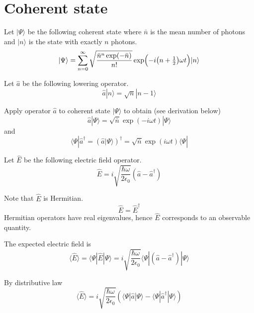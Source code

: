 

\section*{Coherent state}

Let $|\Psi\rangle$ be the following coherent state where $\bar n$ is the mean number of photons
and $|n\rangle$ is the state with exactly $n$ photons.
\begin{equation*}
|\Psi\rangle=\sum_{n=0}^\infty
\sqrt{\frac{\bar n^n\exp(-\bar n)}{n!}}
\exp\Bigl(-i\bigl(n+\tfrac{1}{2}\bigr)\omega t\Bigr)
|n\rangle
\end{equation*}

Let $\hat a$ be the following lowering operator.
\begin{equation*}
\hat a|n\rangle=\sqrt n|n-1\rangle
\end{equation*}

Apply operator $\hat a$ to coherent state $|\Psi\rangle$ to obtain (see derivation below)
\begin{equation*}
\hat a|\Psi\rangle=\sqrt{\bar n}\exp(-i\omega t)|\Psi\rangle
\end{equation*}
and
\begin{equation*}
\langle\Psi|\hat a^\dag=\left(\hat a|\Psi\rangle\right)^\dag=\sqrt{\bar n}\exp(i\omega t)\langle\Psi|
\end{equation*}

Let $\hat E$ be the following electric field operator.
\begin{equation*}
\hat E=i\sqrt{\frac{\hbar\omega}{2\epsilon_0}}
(\hat a-\hat a^\dag)
\end{equation*}

Note that $\hat E$ is Hermitian.
\begin{equation*}
\hat E=\hat E^\dag
\end{equation*}
Hermitian operators have real eigenvalues,
hence $\hat E$ corresponds to an observable quantity.

\bigskip
The expected electric field is
\begin{equation*}
\langle\hat E\rangle
=\langle\Psi|\hat E|\Psi\rangle
=i\sqrt{\frac{\hbar\omega}{2\epsilon_0}}
\langle\Psi|(\hat a-\hat a^\dag)|\Psi\rangle
\end{equation*}

By distributive law
\begin{equation*}
\langle\hat E\rangle
=i\sqrt{\frac{\hbar\omega}{2\epsilon_0}}
\left(\langle\Psi|\hat a|\Psi\rangle-\langle\Psi|\hat a^\dag|\Psi\rangle\right)
\end{equation*}

